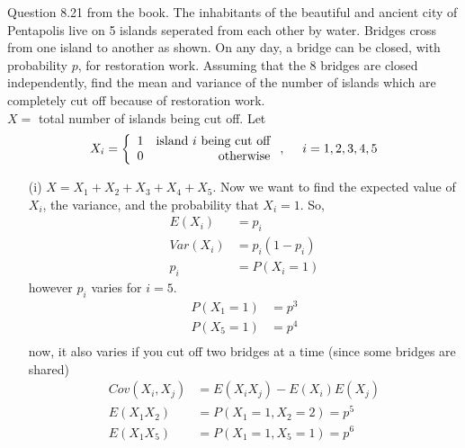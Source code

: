 \documentclass[english, 11pt]{article}
\begin{document}
  \begin{exmp}
    Question 8.21 from the book. The inhabitants of the beautiful and ancient city of Pentapolis live on 5 islands seperated from each other by water.  Bridges cross from one island to another as shown. On any day, a bridge can be closed, with probability $p$, for restoration work. Assuming that the 8 bridges are closed independently, find the mean and variance of the number of islands which are completely cut off because of restoration work. \\

    $X = $ total number of islands being cut off. Let
    \[ X_i = \left\{ \begin{array}{lr} 1 & \mbox{island $i$ being cut off} \\ 0 & \mbox{otherwise} \end{array} \right., \ \ \ \ i = 1,2,3,4,5 \]
    \begin{itemize}
      \item[(i)] $X = X_1 + X_2 + X_3 + X_4 + X_5$. Now we want to find the expected value of $X_i$, the variance, and the probability that $X_i = 1$. So,
      \begin{align*}
        E(X_i) & = p_i \\
        Var(X_i) & = p_i(1-p_i) \\
        p_i & = P(X_i = 1)
      \end{align*}
      however $p_i$ varies for $i = 5$.
      \begin{align*}
        P(X_1 = 1) & = p^3 \\
        P(X_5 = 1) & = p^4 \\
      \end{align*}
      now, it also varies if you cut off two bridges at a time (since some bridges are shared)
      \begin{align*}
        Cov(X_i, X_j) & = E(X_iX_j) - E(X_i)E(X_j) \\
        E(X_1X_2) & = P(X_1 = 1, X_2 = 2) = p^5 \\
        E(X_1X_5) & = P(X_1 = 1, X_5 = 1) = p^6
      \end{align*}
    \end{itemize}
  \end{exmp}
\end{document}
